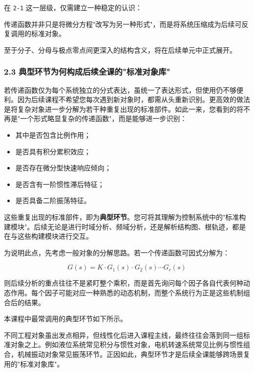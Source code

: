 \documentclass[
  11pt]{article}
\providecommand{\tightlist}{%
  \setlength{\itemsep}{0pt}\setlength{\parskip}{0pt}}
\renewenvironment{quote}
  {\begin{HandoutQuoteBox}\small\color{TitleBlue}\noindent\ignorespaces}
  {\end{HandoutQuoteBox}}
\begin{document}
在 \texttt{2-1} 这一层级，仅需建立一种稳定的认识：

\begin{quote}
传递函数并非只是将微分方程"改写为另一种形式"，而是将系统压缩成为后续可反复调用的标准对象。
\end{quote}

至于分子、分母与极点零点间更深入的结构含义，将在后续单元中正式展开。

\subsubsection{2.3
典型环节为何构成后续全课的"标准对象库"}\label{ux5178ux578bux73afux8282ux4e3aux4f55ux6784ux6210ux540eux7eedux5168ux8bfeux7684ux6807ux51c6ux5bf9ux8c61ux5e93}

若传递函数仅为每个系统独立的分式表达，虽统一了表达形式，但使用仍不够便利。因为后续课程不希望您每次遇到新对象时，都需从头重新识别。更高效的做法是将复杂对象进一步分解为若干种重复出现的标准部件。如此一来，您看到的将不再是"一个形式略显复杂的传递函数"，而是能够进一步识别：

\begin{itemize}
\tightlist
\item
  其中是否包含比例作用；
\item
  是否具有积分累积效应；
\item
  是否存在微分型快速响应倾向；
\item
  是否含有一阶惯性滞后特征；
\item
  是否具备二阶振荡特征。
\end{itemize}

这些重复出现的标准部件，即为\textbf{典型环节}。您可将其理解为控制系统中的"标准构建模块"。后续无论是进行时域分析、频域分析，还是解析结构图、根轨迹，都是在与这些构建模块进行交互。

为说明此点，先考虑一般对象的分解思路。若一个传递函数可因式分解为：

\[
G(s)=K\cdot G_1(s)\cdot G_2(s)\cdots G_r(s)
\]

则后续分析的重点往往不是紧盯整个乘积，而是首先询问每个因子各自代表何种动态作用。每个因子可能对应一种熟悉的动态机制，而整个系统行为正是这些机制组合后的结果。

本课程中最常调用的典型环节如下所示。

不同工程对象虽出发点相异，但线性化后进入课程主线，最终往往会落到同一组标准对象之上。例如液位系统常见积分与惯性对象，电机转速系统常见比例与惯性组合，机械振动对象常见振荡环节。正因如此，典型环节才是后续全课能够跨场景复用的"标准对象库"。
\end{document}
